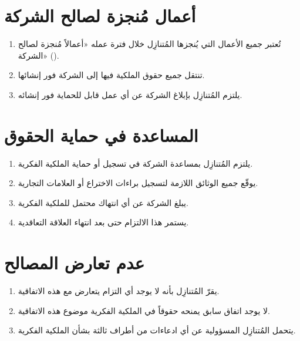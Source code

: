 \documentclass[12pt,a4paper]{article}
\begin{document}
\section{أعمال مُنجزة لصالح الشركة}
\label{sec:workmade}
\begin{enumerate}
    \item تُعتبر جميع الأعمال التي يُنجزها المُتنازِل خلال فترة عمله «أعمالاً مُنجزة لصالح الشركة» ().
    \item تنتقل جميع حقوق الملكية فيها إلى الشركة فور إنشائها.
    \item يلتزم المُتنازِل بإبلاغ الشركة عن أي عمل قابل للحماية فور إنشائه.
\end{enumerate}

\section{المساعدة في حماية الحقوق}
\label{sec:assistance}
\begin{enumerate}
    \item يلتزم المُتنازِل بمساعدة الشركة في تسجيل أو حماية الملكية الفكرية.
    \item يوقّع جميع الوثائق اللازمة لتسجيل براءات الاختراع أو العلامات التجارية.
    \item يبلغ الشركة عن أي انتهاك محتمل للملكية الفكرية.
    \item يستمر هذا الالتزام حتى بعد انتهاء العلاقة التعاقدية.
\end{enumerate}

\section{عدم تعارض المصالح}
\label{sec:noconflict}
\begin{enumerate}
    \item يقرّ المُتنازِل بأنه لا يوجد أي التزام يتعارض مع هذه الاتفاقية.
    \item لا يوجد اتفاق سابق يمنحه حقوقاً في الملكية الفكرية موضوع هذه الاتفاقية.
    \item يتحمل المُتنازِل المسؤولية عن أي ادعاءات من أطراف ثالثة بشأن الملكية الفكرية.
\end{enumerate}
\end{document}
